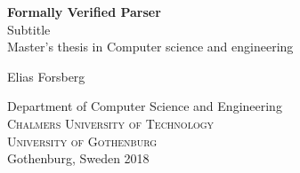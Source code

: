 

\newcommand{\me}{Elias Forsberg}
\newcommand{\titleA}{Formally Verified Parser}
\newcommand{\titleB}{Subtitle}

\begin{titlepage}
			
\addtolength{\voffset}{2cm}

\begin{figure}[H]
\centering
\vspace{1cm}	%
\end{figure}

\mbox{}
\vfill
\renewcommand{\familydefault}{\sfdefault} \normalfont %
\textbf{{\Huge 	\titleA	%
		}} 	\\[0.5cm]
{\Large \titleB}\\[0.5cm]
Master's thesis in Computer science and engineering \setlength{\parskip}{1cm}

{\Large \me} \setlength{\parskip}{2.9cm}

Department of Computer Science and Engineering \\
\textsc{Chalmers University of Technology} \\
\textsc{University of Gothenburg} \\
Gothenburg, Sweden 2018

\renewcommand{\familydefault}{\rmdefault} \normalfont %
\end{titlepage}


\newpage
\restoregeometry
\thispagestyle{empty}
\mbox{}


